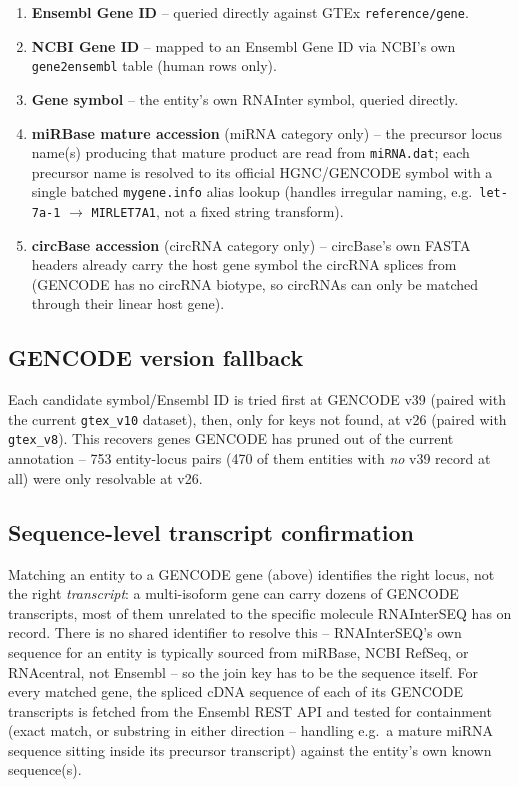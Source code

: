 \documentclass[11pt]{article}
\begin{document}
\begin{enumerate}
  \item \textbf{Ensembl Gene ID} -- queried directly against GTEx
        \texttt{reference/gene}.
  \item \textbf{NCBI Gene ID} -- mapped to an Ensembl Gene ID via NCBI's own
        \texttt{gene2ensembl} table (human rows only).
  \item \textbf{Gene symbol} -- the entity's own RNAInter symbol, queried
        directly.
  \item \textbf{miRBase mature accession} (miRNA category only) -- the
        precursor locus name(s) producing that mature product are read from
        \texttt{miRNA.dat}; each precursor name is resolved to its official
        HGNC/GENCODE symbol with a single batched \texttt{mygene.info}
        alias lookup (handles irregular naming, e.g.\ \texttt{let-7a-1}
        $\rightarrow$ \texttt{MIRLET7A1}, not a fixed string transform).
  \item \textbf{circBase accession} (circRNA category only) -- circBase's
        own FASTA headers already carry the host gene symbol the circRNA
        splices from (GENCODE has no circRNA biotype, so circRNAs can only
        be matched through their linear host gene).
\end{enumerate}

\subsection{GENCODE version fallback}
Each candidate symbol/Ensembl ID is tried first at GENCODE v39 (paired with
the current \texttt{gtex\_v10} dataset), then, only for keys not found, at
v26 (paired with \texttt{gtex\_v8}). This recovers genes GENCODE has pruned
out of the current annotation -- 753 entity-locus pairs (470 of
them entities with \emph{no} v39 record at all) were only resolvable at
v26.

\subsection{Sequence-level transcript confirmation}
Matching an entity to a GENCODE gene (above) identifies the right locus, not
the right \emph{transcript}: a multi-isoform gene can carry dozens of
GENCODE transcripts, most of them unrelated to the specific molecule
RNAInterSEQ has on record. There is no shared identifier to resolve this --
RNAInterSEQ's own sequence for an entity is typically sourced from miRBase,
NCBI RefSeq, or RNAcentral, not Ensembl -- so the join key has to be the
sequence itself. For every matched gene, the spliced cDNA sequence of each
of its GENCODE transcripts is fetched from the Ensembl REST API and tested
for containment (exact match, or substring in either direction -- handling
e.g.\ a mature miRNA sequence sitting inside its precursor transcript)
against the entity's own known sequence(s).
\end{document}
